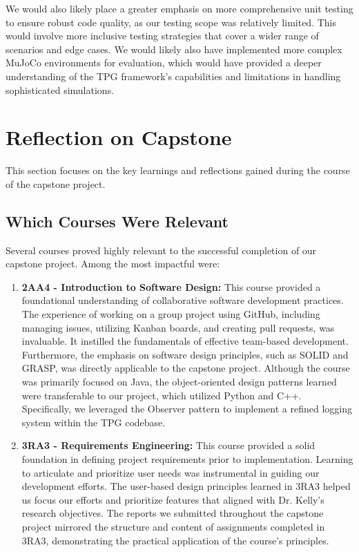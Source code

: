 \documentclass{article}
\begin{document}
We would also likely place a greater emphasis on more comprehensive unit testing to ensure robust code quality, as our testing scope was relatively limited. This would involve more inclusive testing strategies that cover a wider range of scenarios and edge cases. We would likely also have implemented more complex MuJoCo environments for evaluation, which would have provided a deeper understanding of the TPG framework's capabilities and limitations in handling sophisticated simulations.

\section{Reflection on Capstone}

This section focuses on the key learnings and reflections gained during the course of the capstone project.

\subsection{Which Courses Were Relevant}

Several courses proved highly relevant to the successful completion of our capstone project. Among the most impactful were:

\begin{enumerate}
    \item \textbf{2AA4 - Introduction to Software Design:} This course provided a foundational understanding of collaborative software development practices. The experience of working on a group project using GitHub, including managing issues, utilizing Kanban boards, and creating pull requests, was invaluable. It instilled the fundamentals of effective team-based development. Furthermore, the emphasis on software design principles, such as SOLID and GRASP, was directly applicable to the capstone project. Although the course was primarily focused on Java, the object-oriented design patterns learned were transferable to our project, which utilized Python and C++. Specifically, we leveraged the Observer pattern to implement a refined logging system within the TPG codebase.

    \item \textbf{3RA3 - Requirements Engineering:} This course provided a solid foundation in defining project requirements prior to implementation. Learning to articulate and prioritize user needs was instrumental in guiding our development efforts. The user-based design principles learned in 3RA3 helped us focus our efforts and prioritize features that aligned with Dr. Kelly's research objectives. The reports we submitted throughout the capstone project mirrored the structure and content of assignments completed in 3RA3, demonstrating the practical application of the course's principles.
\end{enumerate}
\end{document}
